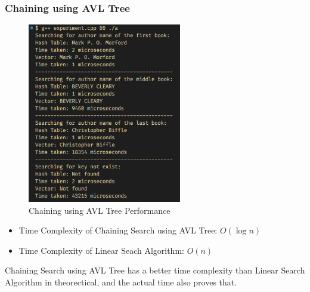 \subsubsection*{Chaining using AVL Tree}
\begin{figure}[H]
	\centering
	\includegraphics[width=0.6\textwidth]{images/chaining_avl/experiment.png}
	\caption{Chaining using AVL Tree Performance}
\end{figure}
\begin{itemize}
	\item Time Complexity of Chaining Search using AVL Tree: \(O(\log n)\)
	\item Time Complexity of Linear Seach Algorithm: \(O(n)\)
\end{itemize}
Chaining Search using AVL Tree has a better time complexity than Linear Search Algorithm in theorectical, and the actual time also proves that.

